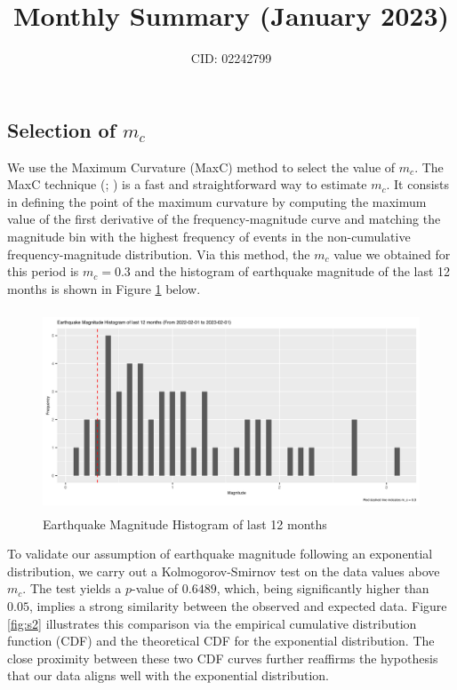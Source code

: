 \documentclass[11pt]{article}
\title{Monthly Summary (January 2023)}
\author{CID: 02242799}
\date{}
\begin{document}
\begin{CJK}{UTF8}{gbsn}
\maketitle


\section*{Selection of $m_c$}

We use the Maximum Curvature (MaxC) method to select the value of $m_c$. The MaxC technique (\cite{wyss1999quantitative}; \cite{wiemer2000minimum}) is a fast and straightforward way to estimate $m_c$. It consists in defining the point of the maximum curvature by computing the maximum value of the first derivative of the frequency-magnitude curve and matching the magnitude bin with the highest frequency of events in the non-cumulative frequency-magnitude distribution.\citep{mignan2012estimating} Via this method, the $m_c$ value we obtained for this period is $m_c=0.3$ and the histogram of earthquake magnitude of the last 12 months is shown in Figure \ref{fig:s1} below.

\begin{figure}[h]
  \centering
  \includegraphics[height=6cm]{../../outputs/mag_hist.png}
  \caption{Earthquake Magnitude Histogram of last 12 months}
  \label{fig:s1}
\end{figure}

To validate our assumption of earthquake magnitude following an exponential distribution, we carry out a Kolmogorov-Smirnov test on the data values above $m_c$. The test yields a $p$-value of $0.6489$, which, being significantly higher than $0.05$, implies a strong similarity between the observed and expected data. Figure \ref{fig:s2} illustrates this comparison via the empirical cumulative distribution function (CDF) and the theoretical CDF for the exponential distribution. The close proximity between these two CDF curves further reaffirms the hypothesis that our data aligns well with the exponential distribution.


\end{CJK}
\end{document}
